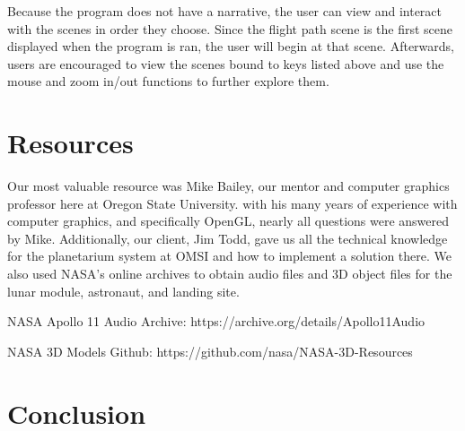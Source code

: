 \documentclass[onecolumn, draftclsnofoot,10pt, compsoc]{IEEEtran}
\begin{document}
Because the program does not have a narrative, the user can view and interact with the scenes in order they choose. Since the flight path scene is the first scene displayed when the program is ran, the user will begin at that scene. Afterwards, users are encouraged to view the scenes bound to keys listed above and use the mouse and zoom in/out functions to further explore them. 


\section{Resources}

Our most valuable resource was Mike Bailey, our mentor and computer graphics professor here at Oregon State University. with his many years of experience with computer graphics, and specifically OpenGL, nearly all questions were answered by Mike. Additionally, our client, Jim Todd, gave us all the technical knowledge for the planetarium system at OMSI and how to implement a solution there. We also used NASA's online archives to obtain audio files and 3D object files for the lunar module, astronaut, and landing site.

NASA Apollo 11 Audio Archive: https://archive.org/details/Apollo11Audio

NASA 3D Models Github: https://github.com/nasa/NASA-3D-Resources

 
 
\section{Conclusion}

\end{document}
